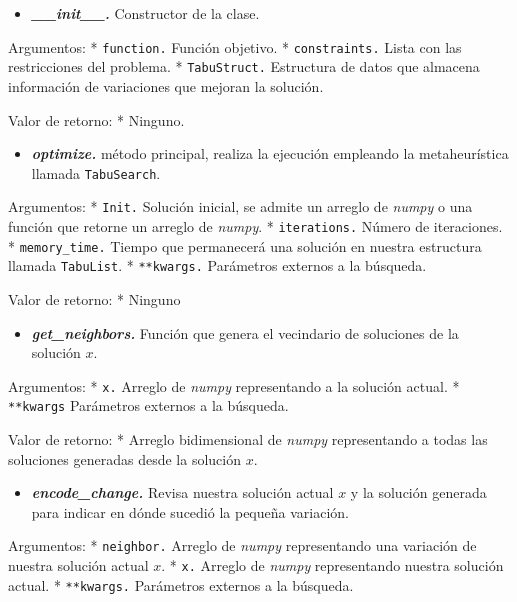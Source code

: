 \documentclass[11pt]{article}
\providecommand{\tightlist}{%
      \setlength{\itemsep}{0pt}\setlength{\parskip}{0pt}}
\begin{document}
\begin{itemize}
\tightlist
\item
  \emph{\textbf{\_\_init\_\_.}} Constructor de la clase.
\end{itemize}

Argumentos: * \texttt{function.} Función objetivo. *
\texttt{constraints.} Lista con las restricciones del problema. *
\texttt{TabuStruct.} Estructura de datos que almacena información de
variaciones que mejoran la solución.

Valor de retorno: * Ninguno.

\begin{itemize}
\tightlist
\item
  \emph{\textbf{optimize.}} método principal, realiza la ejecución
  empleando la metaheurística llamada \texttt{TabuSearch}.
\end{itemize}

Argumentos: * \texttt{Init.} Solución inicial, se admite un arreglo de
\emph{numpy} o una función que retorne un arreglo de \emph{numpy}. *
\texttt{iterations.} Número de iteraciones. * \texttt{memory\_time.}
Tiempo que permanecerá una solución en nuestra estructura llamada
\texttt{TabuList}. * \texttt{**kwargs.} Parámetros externos a la
búsqueda.

Valor de retorno: * Ninguno

\begin{itemize}
\tightlist
\item
  \emph{\textbf{get\_neighbors.}} Función que genera el vecindario de
  soluciones de la solución \(x\).
\end{itemize}

Argumentos: * \texttt{x.} Arreglo de \emph{numpy} representando a la
solución actual. * \texttt{**kwargs} Parámetros externos a la búsqueda.

Valor de retorno: * Arreglo bidimensional de \emph{numpy} representando
a todas las soluciones generadas desde la solución \(x\).

\begin{itemize}
\tightlist
\item
  \emph{\textbf{encode\_change.}} Revisa nuestra solución actual \(x\) y
  la solución generada para indicar en dónde sucedió la pequeña
  variación.
\end{itemize}

Argumentos: * \texttt{neighbor.} Arreglo de \emph{numpy} representando
una variación de nuestra solución actual \(x\). * \texttt{x.} Arreglo de
\emph{numpy} representando nuestra solución actual. * \texttt{**kwargs.}
Parámetros externos a la búsqueda.
\end{document}
